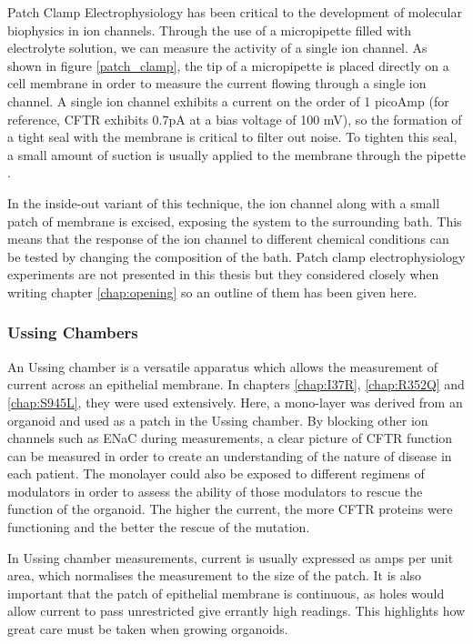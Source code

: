 Patch Clamp Electrophysiology has been critical to the development of molecular biophysics in ion channels. Through the use of a micropipette filled with electrolyte solution, we can measure the activity of a single ion channel. As shown in figure \ref{patch_clamp}, the tip of a micropipette is placed directly on a cell membrane in order to measure the current flowing through a single ion channel. A single ion channel exhibits a current on the order of 1 picoAmp (for reference, CFTR exhibits 0.7pA at a bias voltage of 100 mV), so the formation of a tight seal with the membrane is critical to filter out noise. To tighten this seal, a small amount of suction is usually applied to the membrane through the pipette \cite{aidley1996}.

In the inside-out variant of this technique, the ion channel along with a small patch of membrane is excised, exposing the system to the surrounding bath. This means that the response of the ion channel to different chemical conditions can be tested by changing the composition of the bath. Patch clamp electrophysiology experiments are not presented in this thesis but they considered closely when writing chapter \ref{chap:opening}  so an outline of them has been given here.

\subsubsection{Ussing Chambers}
An Ussing chamber is a versatile apparatus which allows the measurement of current across an epithelial membrane. In chapters \ref{chap:I37R}, \ref{chap:R352Q} and \ref{chap:S945L}, they were used extensively. Here, a mono-layer was derived from an organoid and used as a patch in the Ussing chamber. By blocking other ion channels such as ENaC during measurements, a clear picture of CFTR function can be measured in order to create an understanding of the nature of disease in each patient. The monolayer could also be exposed to different regimens of modulators in order to assess the ability of those modulators to rescue the function of the organoid. The higher the current, the more CFTR proteins were functioning and the better the rescue of the mutation.

In Ussing chamber measurements, current is usually expressed as amps per unit area, which normalises the measurement to the size of the patch. It is also important that the patch of epithelial membrane is continuous, as holes would allow current to pass unrestricted give errantly high readings. This highlights how great care must be taken when growing organoids. 


